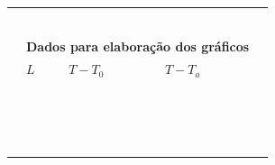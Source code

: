 \begin{table}[!ht]
\begin{tabular}{lllll}
		& \cellcolor[gray]{0.95} & \cellcolor[gray]{0.97} & \cellcolor[gray]{0.95} \\
		& \cellcolor[gray]{0.89} & \cellcolor[gray]{0.92} & \cellcolor[gray]{0.89} \\
		& \cellcolor[gray]{0.95} & \cellcolor[gray]{0.97} & \cellcolor[gray]{0.95} \\
		& \cellcolor[gray]{0.89} & \cellcolor[gray]{0.92} & \cellcolor[gray]{0.89} \\
		& \cellcolor[gray]{0.95} & \cellcolor[gray]{0.97} & \cellcolor[gray]{0.95} \\
		\cmidrule{2-4}
\\
		&\multicolumn{3}{l}{\textbf{Dados para elaboração dos gráficos}} \\
		\cmidrule{2-4}
		& $L$ & $T - T_0$ & $T - T_a$ \\
		\cmidrule{2-4}
		& \cellcolor[gray]{0.89} & \cellcolor[gray]{0.92} & \cellcolor[gray]{0.89} \\
		& \cellcolor[gray]{0.95} & \cellcolor[gray]{0.97} & \cellcolor[gray]{0.95} \\
		& \cellcolor[gray]{0.89} & \cellcolor[gray]{0.92} & \cellcolor[gray]{0.89} \\
		& \cellcolor[gray]{0.95} & \cellcolor[gray]{0.97} & \cellcolor[gray]{0.95} \\
		& \cellcolor[gray]{0.89} & \cellcolor[gray]{0.92} & \cellcolor[gray]{0.89} \\
		& \cellcolor[gray]{0.95} & \cellcolor[gray]{0.97} & \cellcolor[gray]{0.95} \\
		& \cellcolor[gray]{0.89} & \cellcolor[gray]{0.92} & \cellcolor[gray]{0.89} \\
		& \cellcolor[gray]{0.95} & \cellcolor[gray]{0.97} & \cellcolor[gray]{0.95} \\
		& \cellcolor[gray]{0.89} & \cellcolor[gray]{0.92} & \cellcolor[gray]{0.89} \\
		& \cellcolor[gray]{0.95} & \cellcolor[gray]{0.97} & \cellcolor[gray]{0.95} \\
		& \cellcolor[gray]{0.89} & \cellcolor[gray]{0.92} & \cellcolor[gray]{0.89} \\
		& \cellcolor[gray]{0.95} & \cellcolor[gray]{0.97} & \cellcolor[gray]{0.95} \\
		& \cellcolor[gray]{0.89} & \cellcolor[gray]{0.92} & \cellcolor[gray]{0.89} \\
		& \cellcolor[gray]{0.95} & \cellcolor[gray]{0.97} & \cellcolor[gray]{0.95} \\
		& \cellcolor[gray]{0.89} & \cellcolor[gray]{0.92} & \cellcolor[gray]{0.89} \\
		& \cellcolor[gray]{0.95} & \cellcolor[gray]{0.97} & \cellcolor[gray]{0.95} \\
		\bottomrule
	\end{tabular}
\end{table}


